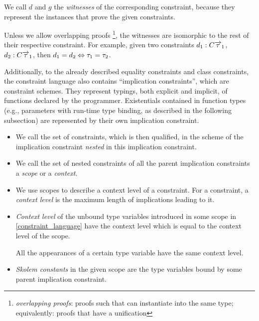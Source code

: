 We call $d$ and $g$ the \emph{witnesses} of the corresponding constraint, because they represent the instances that prove the given constraints.

Unless we allow overlapping proofs \footnote{\emph{overlapping proofs}: proofs such that can instantiate into the same type; equivalently: proofs that have a unification}, the witnesses are isomorphic to the rest of their respective constraint. For example, given two constraints $d_1: C \overrightarrow{\tau}_1$, $d_2: C \overrightarrow{\tau}_1$, then $d_1 = d_2 \Leftrightarrow \tau_1 = \tau_2$.

Additionally, to the already described equality constraints and class constraints, the constraint language also contains ``implication constraints'', which are constraint schemes. They represent typings, both explicit and implicit, of functions declared by the programmer. Existentials contained in function types (e.g., parameters with run-time type binding, as described in the following subsection) are represented by their own implication constraint.

\begin{defn}[Naming]
    \begin{itemize}
        \item We call the set of constraints, which is then qualified, in the scheme of the implication constraint \emph{nested} in this implication constraint.

        \item We call the set of nested constraints of all the parent implication constraints a \emph{scope} or a \emph{context}.

        \item We use scopes to describe a context level of a constraint. For a constraint, a \emph{context level} is the maximum length of implications leading to it.

        \item \emph{Context level} of the unbound type variables introduced in some scope in \cref{constraint_language} have the context level which is equal to the context level of the scope.

        All the appearances of a certain type variable have the same context level.

        \item \emph{Skolem constants} in the given scope are the type variables bound by some parent implication constraint.
    \end{itemize}
\end{defn}

